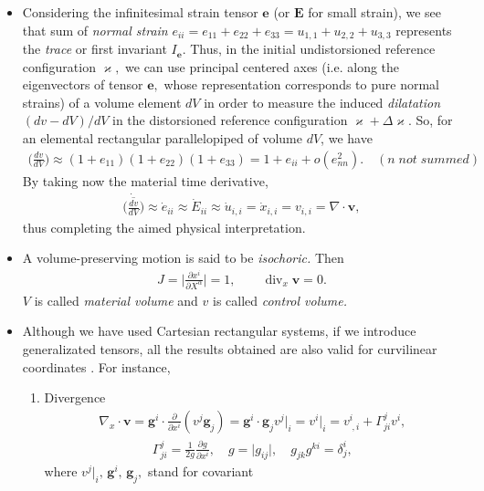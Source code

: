 \documentclass[12pt]{article}
\begin{document}
\begin{itemize}
\item{Considering the infinitesimal strain tensor $\mathbf{e}$ (or $\mathbf{E}$ for small strain), we see that sum of {\em normal strain} $e_{ii}=e_{11}+e_{22}+e_{33}=u_{1,1}+u_{2,2}+u_{3,3}$ represents the {\em trace} or first invariant $I_{\mathbf{e}}$. Thus, in the initial undistorsioned reference configuration $\varkappa,$ we can use principal centered axes (i.e. along the eigenvectors of tensor $\mathbf{e},$ whose representation corresponds to pure normal strains) of a volume element $dV$ in order to measure the induced {\em dilatation} $(dv-dV)/dV$ in the distorsioned reference configuration $\varkappa + \Delta\varkappa$. So, for an elemental rectangular parallelopiped of volume $dV$, we have
\begin{align*}
\Big(\frac{dv}{dV}\Big)\approx (1+e_{11})(1+e_{22})(1+e_{33})=1+e_{ii}+ o(e^2_{nn}). \quad   (n\; not\; summed)
\end{align*}
By taking now the material time derivative,
\begin{align*}
\dot{\overline{\Big(\frac{dv}{dV}\Big)}}\approx \dot{e}_{ii}\approx\dot{E}_{ii}\approx\dot{u}_{i,i}=\dot{x}_{i,i}=v_{i,i}=
\nabla\cdot\mathbf{v},
\end{align*}
thus completing the aimed physical interpretation.}
\item{A volume-preserving motion is said to be {\em isochoric.} Then
\begin{align*}
J=\bigg\vert\frac{\partial x^i}{\partial X^\alpha}\bigg\vert=1, \qquad \operatorname{div}_x\mathbf{v}=0.
\end{align*}
$V$ is called {\em material volume} and $v$ is called {\em control volume.}}
\item{Although we have used Cartesian rectangular systems, if we introduce generalizated tensors, all the results obtained are also valid for curvilinear coordinates . For instance,
\begin{enumerate}
\item Divergence
\begin{align*}
\nabla_x\cdot\mathbf{v}=\mathbf{g}^i\cdot\frac{\partial}{\partial{x^i}}
(v^j\mathbf{g}_j)=\mathbf{g}^i\cdot\mathbf{g}_j v^j\vert_i =v^i\vert_i=v^i_{\;,i}+\Gamma^j_{ji}v^i, 
\end{align*}
\begin{align*} 
\Gamma^j_{ji}=\frac{1}{2g}\frac{\partial{g}}{\partial{x}^i}, \quad
g=\vert{g_{ij}}\vert,
\quad g_{jk}g^{ki}=\delta^i_j,
\end{align*}
where $v^j\vert_i,\,\mathbf{g}^i,\,\mathbf{g}_j,$ stand for covariant 

\end{enumerate}}
\end{itemize}
\end{document}
